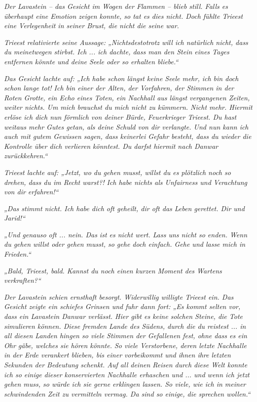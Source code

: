 \textit{Der Lavastein – das Gesicht im Wogen der Flammen – blieb still. Falls es überhaupt eine Emotion zeigen konnte, so tat es dies nicht. Doch fühlte Trieest eine Verlegenheit in seiner Brust, die nicht die seine war.}

\textit{Trieest relativierte seine Aussage: „Nichtsdestotrotz will ich natürlich nicht, dass du meinetwegen stirbst. Ich ... ich dachte, dass man den Stein eines Tages entfernen könnte und deine Seele oder so erhalten bliebe.“}

\textit{Das Gesicht lachte auf: „Ich habe schon längst keine Seele mehr, ich bin doch schon lange tot! Ich bin einer der Alten, der Vorfahren, der Stimmen in der Roten Grotte, ein Echo eines Toten, ein Nachhall aus längst vergangenen Zeiten, weiter nichts. Um mich brauchst du mich nicht zu kümmern. Nicht mehr. Hiermit erlöse ich dich nun förmlich von deiner Bürde, Feuerkrieger Trieest. Du hast weitaus mehr Gutes getan, als deine Schuld von dir verlangte. Und nun kann ich auch mit gutem Gewissen sagen, dass keinerlei Gefahr besteht, dass du wieder die Kontrolle über dich verlieren könntest. Du darfst hiermit nach Danwar zurückkehren.“}

\textit{Trieest lachte auf: „Jetzt, wo du gehen musst, willst du es plötzlich noch so drehen, dass du im Recht warst?! Ich habe nichts als Unfairness und Verachtung von dir erfahren!“}

\textit{„Das stimmt nicht. Ich habe dich oft geheilt, dir oft das Leben gerettet. Dir und Jarid!“}

\textit{„Und genauso oft ... nein. Das ist es nicht wert. Lass uns nicht so enden. Wenn du gehen willst oder gehen musst, so gehe doch einfach. Gehe und lasse mich in Frieden.“}

\textit{„Bald, Trieest, bald. Kannst du noch einen kurzen Moment des Wartens verkraften?“}

\textit{Der Lavastein schien ernsthaft besorgt. Widerwillig willigte Trieest ein. Das Gesicht zeigte ein schiefes Grinsen und fuhr dann fort: „Es kommt selten vor, dass ein Lavastein Danwar verlässt. Hier gibt es keine solchen Steine, die Tote simulieren können. Diese fremden Lande des Südens, durch die du reistest ... in all diesen Landen hingen so viele Stimmen der Gefallenen fest, ohne dass es ein Ohr gäbe, welches sie hören könnte. So viele Verstorbene, deren letzte Nachhalle in der Erde verankert blieben, bis einer vorbeikommt und ihnen ihre letzten Sekunden der Bedeutung schenkt. Auf all deinen Reisen durch diese Welt konnte ich so einige dieser konservierten Nachhalle erhaschen und ... und wenn ich jetzt gehen muss, so würde ich sie gerne erklingen lassen. So viele, wie ich in meiner schwindenden Zeit zu vermitteln vermag. Da sind so einige, die sprechen wollen.“}

